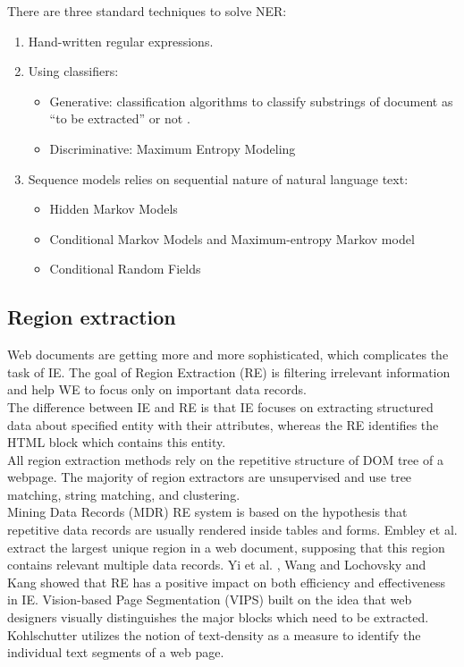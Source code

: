 There are three standard techniques to solve NER: 

\begin{enumerate}
    \item Hand-written regular expressions.
    \item Using classifiers:
    \begin{itemize}
        \item Generative: classification algorithms to classify substrings of document as “to be extracted” or not \cite{nerclass}.
        \item Discriminative: Maximum Entropy Modeling \cite{MaxEntropy}
    \end{itemize}
    \item Sequence models relies on sequential nature of natural language text:
    \begin{itemize}
        \item Hidden Markov Models \cite{HMM}
        \item Conditional Markov Models and Maximum-entropy Markov model \cite{CondModel}
        \item Conditional Random Fields \cite{ConditionalRF}
    \end{itemize}
\end{enumerate}


\subsection{Region extraction}
Web documents are getting more and more sophisticated, which complicates the task of IE. The goal of Region Extraction (RE) is filtering irrelevant information and help WE to focus only on important data records.\\

The difference between IE and RE is that IE focuses on extracting structured data about specified entity with their attributes, whereas the RE identifies the HTML block which contains this entity.\\

All region extraction methods rely on the repetitive structure of DOM tree of a webpage. The majority of region extractors are unsupervised and use tree matching, string matching, and clustering.\\

Mining Data Records (MDR) RE system \cite{LiuMinData} is based on the hypothesis that repetitive data records are usually rendered inside tables and forms. Embley et al. \cite{Embley} extract the largest unique region in a web document, supposing that this region contains relevant multiple data records. Yi et al. \cite{Noisy}, Wang and Lochovsky \cite{Wang} and Kang \cite{Kang} showed that RE has a positive impact on both efficiency and effectiveness in IE. Vision-based Page Segmentation (VIPS) \cite{Vips} built on the idea that web designers visually distinguishes the major blocks which need to be extracted. Kohlschutter \cite{Kohlschutter} utilizes the notion of text-density as a measure to identify the individual text segments of a web page.\\

